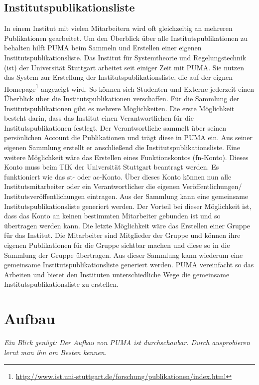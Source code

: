 \documentclass[b5paper,11pt,twoside]{scrbook} %
\begin{document}
\subsection{Institutspublikationsliste}
In einem Institut mit vielen Mitarbeitern wird oft gleichzeitig an mehreren Publikationen gearbeitet. Um den Überblick über alle Institutspublikationen zu behalten hilft PUMA beim Sammeln und Erstellen einer eigenen Institutspublikationsliste. \newline
Das Institut für Systemtheorie und Regelungstechnik (ist) der Universität Stuttgart arbeitet seit einiger Zeit mit PUMA. Sie nutzen das System zur Erstellung der Institutspublikationsliste, die auf der eignen Homepage\footnote{\url{http://www.ist.uni-stuttgart.de/forschung/publikationen/index.html}} angezeigt wird. So können sich Studenten und Externe jederzeit einen Überblick über die Institutspublikationen verschaffen.\newline
Für die Sammlung der Institutspublikationen gibt es mehrere Möglichkeiten. Die erste Möglichkeit besteht darin, dass das Institut einen Verantwortlichen für  die Institutspublikationen festlegt. Der Verantwortliche sammelt über seinen persönlichen Account die Publikationen und trägt diese in PUMA ein. Aus seiner eigenen Sammlung erstellt er anschließend die Institutspublikationsliste. Eine weitere Möglichkeit wäre das Erstellen eines Funktionskontos (fn-Konto). Dieses Konto muss beim TIK der Universität Stuttgart beantragt werden. Es funktioniert wie das st- oder ac-Konto. Über dieses Konto können nun alle Institutsmitarbeiter oder ein Verantwortlicher die eigenen Veröffentlichungen/ Institutsveröffentlichungen eintragen. Aus der Sammlung kann eine gemeinsame Institutspublikationsliste generiert werden. Der Vorteil bei dieser Möglichkeit ist, dass das Konto an keinen bestimmten Mitarbeiter gebunden ist und so übertragen werden kann. Die letzte Möglichkeit wäre das Erstellen einer Gruppe für das Institut. Die Mitarbeiter sind Mitglieder der Gruppe und können ihre eigenen Publikationen für die Gruppe sichtbar machen und diese so in die Sammlung der Gruppe übertragen. Aus dieser  Sammlung kann wiederum eine gemeinsame Institutspublikationsliste generiert werden.\newline
PUMA vereinfacht so das Arbeiten und bietet den Instituten unterschiedliche Wege die gemeinsame Institutspublikationsliste zu erstellen.

\newpage
\section{Aufbau}
\textit{Ein Blick genügt: Der Aufbau von PUMA ist durchschaubar. Durch ausprobieren lernt man ihn am Besten kennen.}
\end{document}
